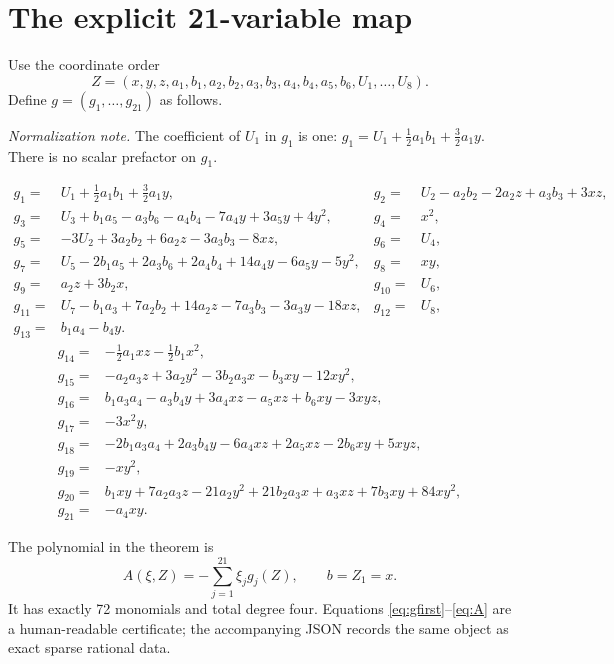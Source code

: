 \documentclass[11pt]{article}
\begin{document}
\section{The explicit 21-variable map}

Use the coordinate order
\[
 Z=(x,y,z,a_1,b_1,a_2,b_2,a_3,b_3,a_4,b_4,a_5,b_6,U_1,\ldots,U_8).
\]
Define $g=(g_1,\ldots,g_{21})$ as follows.

\begin{samepage}
\noindent\textit{Normalization note.}
The coefficient of $U_1$ in $g_1$ is one:
$g_1=U_1+\tfrac12a_1b_1+\tfrac32a_1y$. There is no scalar prefactor on
$g_1$.

\begingroup\small
\begin{align}
g_1={}&U_1+\tfrac12a_1b_1+\tfrac32a_1y,&
g_2={}&U_2-a_2b_2-2a_2z+a_3b_3+3xz,\nonumber\\
g_3={}&U_3+b_1a_5-a_3b_6-a_4b_4-7a_4y+3a_5y+4y^2,&
g_4={}&x^2,\nonumber\\
g_5={}&-3U_2+3a_2b_2+6a_2z-3a_3b_3-8xz,&
g_6={}&U_4,\nonumber\\
g_7={}&U_5-2b_1a_5+2a_3b_6+2a_4b_4+14a_4y-6a_5y-5y^2,&
g_8={}&xy,\nonumber\\
g_9={}&a_2z+3b_2x,&g_{10}={}&U_6,\nonumber\\
g_{11}={}&U_7-b_1a_3+7a_2b_2+14a_2z-7a_3b_3-3a_3y-18xz,&
g_{12}={}&U_8,\nonumber\\
g_{13}={}&b_1a_4-b_4y.&& \label{eq:gfirst}
\end{align}
\begin{align}
g_{14}={}&-\tfrac12a_1xz-\tfrac12b_1x^2,\nonumber\\
g_{15}={}&-a_2a_3z+3a_2y^2-3b_2a_3x-b_3xy-12xy^2,\nonumber\\
g_{16}={}&b_1a_3a_4-a_3b_4y+3a_4xz-a_5xz+b_6xy-3xyz,\nonumber\\
g_{17}={}&-3x^2y,\nonumber\\
g_{18}={}&-2b_1a_3a_4+2a_3b_4y-6a_4xz+2a_5xz-2b_6xy+5xyz,\nonumber\\
g_{19}={}&-xy^2,\nonumber\\
g_{20}={}&b_1xy+7a_2a_3z-21a_2y^2+21b_2a_3x+a_3xz+7b_3xy+84xy^2,\nonumber\\
g_{21}={}&-a_4xy. \label{eq:gsecond}
\end{align}
\endgroup
\end{samepage}

The polynomial in the theorem is
\begin{equation}
 A(\xi,Z)=-\sum_{j=1}^{21}\xi_jg_j(Z),\qquad b=Z_1=x. \label{eq:A}
\end{equation}
It has exactly 72 monomials and total degree four. Equations
\eqref{eq:gfirst}--\eqref{eq:A} are a human-readable certificate; the
accompanying JSON records the same object as exact sparse rational data.
\end{document}
